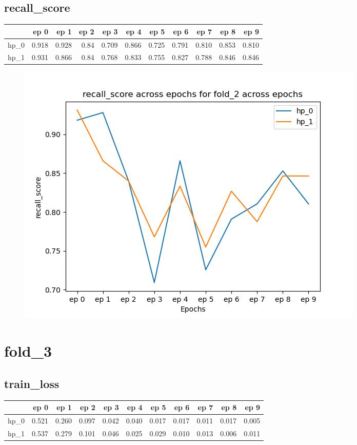 \documentclass{article}
\begin{document}
\subsection{recall\_score}
\begin{tabular}{lrrrrrrrrrr}
\toprule
{} &   ep 0 &   ep 1 &  ep 2 &   ep 3 &   ep 4 &   ep 5 &   ep 6 &   ep 7 &   ep 8 &   ep 9 \\
\midrule
hp\_0 &  0.918 &  0.928 &  0.84 &  0.709 &  0.866 &  0.725 &  0.791 &  0.810 &  0.853 &  0.810 \\
hp\_1 &  0.931 &  0.866 &  0.84 &  0.768 &  0.833 &  0.755 &  0.827 &  0.788 &  0.846 &  0.846 \\
\bottomrule
\end{tabular}

\begin{figure}[H]
\includegraphics[scale = 0.75]{fold_2/recall_score}
\end{figure}
\section{fold\_3}
\subsection{train\_loss}
\begin{tabular}{lrrrrrrrrrr}
\toprule
{} &   ep 0 &   ep 1 &   ep 2 &   ep 3 &   ep 4 &   ep 5 &   ep 6 &   ep 7 &   ep 8 &   ep 9 \\
\midrule
hp\_0 &  0.521 &  0.260 &  0.097 &  0.042 &  0.040 &  0.017 &  0.017 &  0.011 &  0.017 &  0.005 \\
hp\_1 &  0.537 &  0.279 &  0.101 &  0.046 &  0.025 &  0.029 &  0.010 &  0.013 &  0.006 &  0.011 \\
\bottomrule
\end{tabular}
\end{document}

